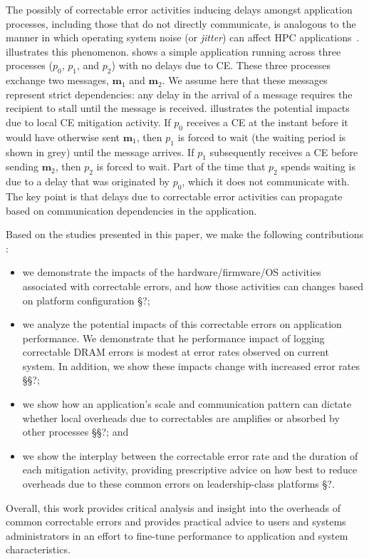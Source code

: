 The possibly of correctable error activities inducing delays amongst application
processes, including those that do not directly communicate, is analogous to the
manner in which operating system noise (or \emph{jitter}) can affect HPC
applications~\cite{Hoefler:2010:Characterizing, Ferreira:08:characterizing}.
 illustrates this phenomenon.   shows
a simple application running across three processes ($p_0$, $p_1$, and $p_2$)
with no delays due to CE.  These three processes exchange two messages,
$\mathbf{m}_1$ and $\mathbf{m}_2$.  We assume here that these messages represent
strict dependencies: any delay in the arrival of a message requires the
recipient to stall until the message is received. 
illustrates the potential impacts due to local CE mitigation activity.  If $p_0$
receives a CE at the instant before it would have otherwise sent $\mathbf{m}_1$,
then $p_1$ is forced to wait (the waiting period is shown in grey) until the
message arrives.  If $p_1$ subsequently receives a CE before sending
$\mathbf{m}_2$, then $p_2$ is forced to wait.  Part of the time that $p_2$
spends waiting is due to a delay that was originated by $p_0$, which it does not
communicate with.  The key point is that delays due to correctable error
activities can propagate based on communication dependencies in the application.

Based on the studies presented in this paper, we make the following
contributions :

\begin{itemize}

\item we demonstrate the impacts of the hardware/firmware/OS activities
        associated with correctable errors, and how those activities can changes
        based on platform configuration \S{?};

\item we analyze the potential impacts of this correctable errors on application
        performance.  We demonstrate that he performance impact of logging
                correctable DRAM errors is modest at error rates observed on
                current system.  In addition, we show these impacts change with
                increased error rates \S\S{?};

\item we show how an application's scale and communication pattern can dictate
        whether local overheads due to correctables are amplifies or absorbed by
        other processes \S\S{?}; and

\item we show the interplay between the correctable error rate and the duration
        of each mitigation activity, providing prescriptive advice on how best
        to reduce overheads due to these common errors on leadership-class platforms
        \S{?}.

\end{itemize}

Overall, this work provides critical analysis and insight into the overheads of
common correctable errors and provides practical advice to users and systems
administrators in an effort to fine-tune performance to application and system
characteristics.
